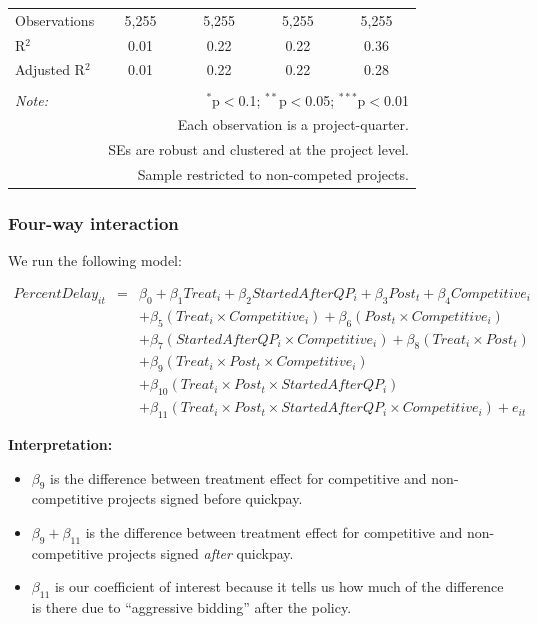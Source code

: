\documentclass[
]{article}
\providecommand{\tightlist}{%
  \setlength{\itemsep}{0pt}\setlength{\parskip}{0pt}}
\begin{document}
\begin{table}[H]
\begin{tabular}{@{\extracolsep{-2pt}}lcccc}
Observations & 5,255 & 5,255 & 5,255 & 5,255 \\ 
R$^{2}$ & 0.01 & 0.22 & 0.22 & 0.36 \\ 
Adjusted R$^{2}$ & 0.01 & 0.22 & 0.22 & 0.28 \\ 
\hline 
\hline \\[-1.8ex] 
\textit{Note:}  & \multicolumn{4}{r}{$^{*}$p$<$0.1; $^{**}$p$<$0.05; $^{***}$p$<$0.01} \\ 
 & \multicolumn{4}{r}{Each observation is a project-quarter.} \\ 
 & \multicolumn{4}{r}{SEs are robust and clustered at the project level.} \\ 
 & \multicolumn{4}{r}{Sample restricted to non-competed projects.} \\ 
\end{tabular} 
\end{table}

\hypertarget{four-way-interaction}{%
\subsubsection{Four-way interaction}\label{four-way-interaction}}

We run the following model:

\[\begin{aligned} PercentDelay_{it} &=& \beta_0 +\beta_1 Treat_i+ \beta_2 StartedAfterQP_i+ \beta_3 Post_t+ \beta_4 Competitive_i\\ && +  \beta_5 (Treat_i \times Competitive_i) + \beta_6 (Post_t \times Competitive_i)\\ && +  \beta_7 (StartedAfterQP_i \times Competitive_i) +\beta_8 (Treat_i \times Post_t)\\ && + \beta_9 (Treat_i \times Post_t \times Competitive_i) \\ && + \beta_{10} (Treat_i \times Post_t \times StartedAfterQP_i )\\ && + \beta_{11} (Treat_i \times Post_t \times StartedAfterQP_i \times Competitive_i) + e_{it} \end{aligned}\]

\textbf{Interpretation:}

\begin{itemize}
\tightlist
\item
  \(\beta_9\) is the difference between treatment effect for competitive
  and non-competitive projects signed before quickpay.
\item
  \(\beta_9 + \beta_{11}\) is the difference between treatment effect
  for competitive and non-competitive projects signed \emph{after}
  quickpay.
\item
  \(\beta_{11}\) is our coefficient of interest because it tells us how
  much of the difference is there due to ``aggressive bidding'' after
  the policy.
\end{itemize}
\end{document}
